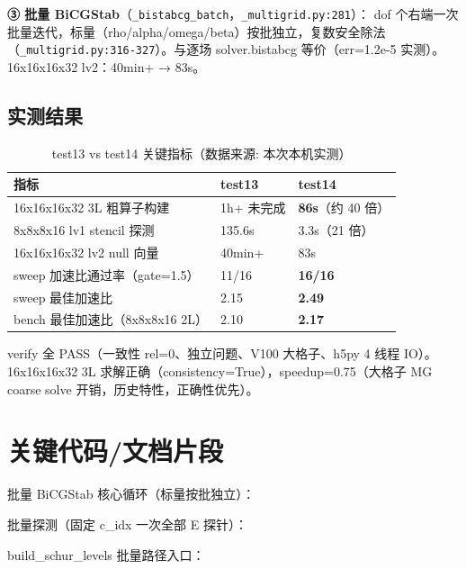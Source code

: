 \documentclass[UTF8]{ctexart}
\begin{document}
\textbf{③ 批量 BiCGStab}（\texttt{\_bistabcg\_batch}，\texttt{\_multigrid.py:281}）：
dof 个右端一次批量迭代，标量（rho/alpha/omega/beta）按批独立，复数安全除法
（\texttt{\_multigrid.py:316-327}）。与逐场 solver.bistabcg 等价（err=1.2e-5 实测）。
16x16x16x32 lv2：40min+ → 83s。

\subsection{实测结果}
\begin{table}[htbp]\centering
\begin{tabular}{lll}
\toprule
指标 & test13 & test14 \\
\midrule
16x16x16x32 3L 粗算子构建 & 1h+ 未完成 & \textbf{86s}（约 40 倍） \\
8x8x8x16 lv1 stencil 探测 & 135.6s & 3.3s（21 倍） \\
16x16x16x32 lv2 null 向量 & 40min+ & 83s \\
sweep 加速比通过率（gate=1.5） & 11/16 & \textbf{16/16} \\
sweep 最佳加速比 & 2.15 & \textbf{2.49} \\
bench 最佳加速比（8x8x8x16 2L） & 2.10 & \textbf{2.17} \\
\bottomrule
\end{tabular}
\caption{test13 vs test14 关键指标（数据来源: 本次本机实测）}
\end{table}

verify 全 PASS（一致性 rel=0、独立问题、V100 大格子、h5py 4 线程 IO）。
16x16x16x32 3L 求解正确（consistency=True），speedup=0.75（大格子 MG coarse
solve 开销，历史特性，正确性优先）。

\section{关键代码/文档片段}
批量 BiCGStab 核心循环（标量按批独立）：


批量探测（固定 c\_idx 一次全部 E 探针）：


build\_schur\_levels 批量路径入口：


\end{document}
